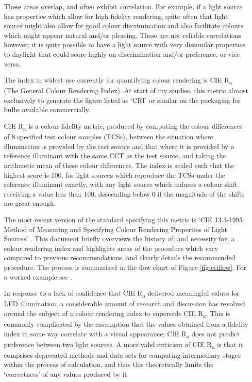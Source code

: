 These areas overlap, and often exhibit correlation. For example, if a light source has properties which allow for high fidelity rendering, quite often that light source might also allow for good colour discrimination and also facilitate colours which might appear natural and/or pleasing. These are not reliable correlations however; it is quite possible to have a light source with very dissimilar properties to daylight that could score highly on discrimination and/or preference, or vice versa.

The index in widest use currently for quantifying colour rendering is CIE R\textsubscript{a} (The General Colour Rendering Index). At start of my studies, this metric almost exclusively to generate the figure listed as `CRI' or similar on the packaging for bulbs available commercially. %

CIE R\textsubscript{a} is a colour fidelity metric, produced by computing the colour differences of 8 specified test colour samples (TCSs), between the situation where illumination is provided by the test source and that where it is provided by a reference illuminant with the same \gls{CCT} as the test source, and taking the arithmetic mean of these colour differences. The index is scaled such that the highest score is 100, for light sources which reproduce the TCSs under the reference illuminant exactly, with any light source which induces a colour shift receiving a value less than 100, descending below 0 if the magnitude of the shifts are great enough.

The most recent version of the standard specifying this metric is `CIE 13.3-1995 Method of Measuring and Specifying Colour Rendering Properties of Light Sources' \citep{cie_cie_1995}. This document briefly overviews the history of, and necessity for, a colour rendering index and highlights areas of the procedure which vary compared to previous recommendations, and clearly details the recommended procedure. The process is summarised in the flow chart of Figure \ref{fig:criflow}. For a worked example see \citet[p.388]{hunt_measuring_2011}.

In response to a lack of confidence that CIE R\textsubscript{a} delivered meaningful values for LED illumination, a considerable amount of research and discussion has revolved around the subject of a colour rendering index to supersede CIE R\textsubscript{a}. This is commonly complicated by the assumption that the values obtained from a fidelity index in some way correlate with a visual appearance; CIE R\textsubscript{a} does not predict preference between two light sources. A more valid criticism of CIE R\textsubscript{a} is that it comprises deprecated methods and data sets for computing intermediary stages within the process of calculation, and thus this theoretically limits the `correctness' of any values produced by it.

